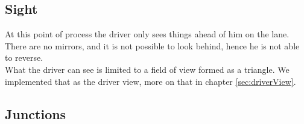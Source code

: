 \subsection{Sight}
\label{sec:sight}

At this point of process the driver only sees things ahead of him on the
lane. There are no mirrors, and it is not possible to look behind, hence
he is not able to reverse.\\

\noindent What the driver can see is limited to a field of view formed as a triangle.
We implemented that as the driver view, more on that in chapter 
\ref{sec:driverView}.

\subsection{Junctions}
\label{sec:driverJunctions}

